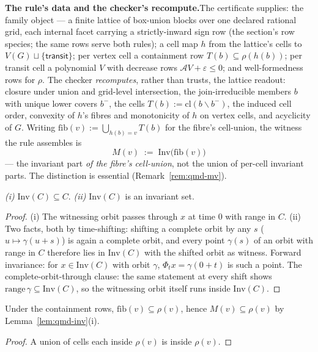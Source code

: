 \textbf{The rule's data and the checker's recompute.}\enspace The
certificate supplies: the family object --- a finite lattice of
box-union blocks over one declared rational grid, each internal facet
carrying a strictly-inward sign row (the  section's
row species; the same rows serve both rules); a cell map $h$ from the
lattice's cells to $V(G) \sqcup \{\mathsf{transit}\}$; per vertex cell
a containment row $T(b) \subseteq \rho(h(b))$; per transit cell a
polynomial $V$ with decrease rows $\mathcal{A}V + \varepsilon \leq 0$;
and well-formedness rows for $\rho$. The checker \emph{recomputes},
rather than trusts, the lattice readout: closure under union and
grid-level intersection, the join-irreducible members $b$ with unique
lower covers $b^-$, the cells $T(b) := \mathrm{cl}(b \smallsetminus
b^-)$, the induced cell order, convexity of $h$'s fibres and
monotonicity of $h$ on vertex cells, and acyclicity of $G$. Writing
$\mathrm{fib}(v) := \bigcup_{h(b) = v} T(b)$ for the fibre's
cell-union, the witness the rule assembles is
\[
M(v) \;:=\; \mathrm{Inv}\big(\mathrm{fib}(v)\big)
\]
--- the invariant part \emph{of the fibre's cell-union}, not the union
of per-cell invariant parts. The distinction is essential
(Remark~\ref{rem:qmd-mv}).

\begin{blemma}
\label{lem:qmd-inv}
\emph{(i)} $\mathrm{Inv}(C) \subseteq C$.
\emph{(ii)} $\mathrm{Inv}(C)$ is an invariant set.
\end{blemma}
\begin{proof}
(i) The witnessing orbit passes through $x$ at time $0$ with range in
$C$. (ii) Two facts, both by time-shifting: shifting a complete orbit
by any $s$ ($u \mapsto \gamma(u + s)$) is again a complete orbit, and
every point $\gamma(s)$ of an orbit with range in $C$ therefore lies in
$\mathrm{Inv}(C)$ with the shifted orbit as witness. Forward
invariance: for $x \in \mathrm{Inv}(C)$ with orbit $\gamma$,
$\Phi_t x = \gamma(0 + t)$ is such a point. The complete-orbit-through
clause: the same statement at every shift shows
$\mathrm{range}\,\gamma \subseteq \mathrm{Inv}(C)$, so the witnessing
orbit itself runs inside $\mathrm{Inv}(C)$.
\end{proof}

\begin{blemma}[location]\label{lem:qmd-loc}
Under the containment rows, $\mathrm{fib}(v) \subseteq \rho(v)$, hence
$M(v) \subseteq \rho(v)$ by Lemma~\ref{lem:qmd-inv}(i).
\end{blemma}
\begin{proof}
A union of cells each inside $\rho(v)$ is inside $\rho(v)$.
\end{proof}

